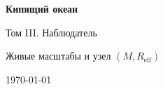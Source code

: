 \begin{titlepage}
  \centering
  \vspace*{2cm}
  {\LARGE\bfseries Кипящий океан\par}
  \vspace{0.8cm}
  {\Large Том III. Наблюдатель\par}
  \vspace{1.2cm}
  {\large Живые масштабы и узел $(M, R_{\mathrm{eff}})$\par}
  \vfill
  {\large \today\par}
\end{titlepage}
\cleardoublepage
\tableofcontents
\cleardoublepage
